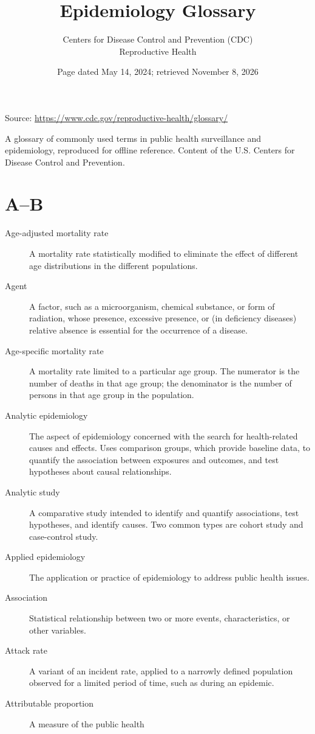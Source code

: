 \documentclass[11pt]{article}
\title{Epidemiology Glossary}
\author{Centers for Disease Control and Prevention (CDC)\\
Reproductive Health}
\date{Page dated May 14, 2024; retrieved November 8, 2026}
\begin{document}
\maketitle

\noindent Source: \url{https://www.cdc.gov/reproductive-health/glossary/}

\noindent A glossary of commonly used terms in public health
surveillance and epidemiology, reproduced for offline reference.
Content of the U.S. Centers for Disease Control and Prevention.

\section*{A--B}

\begin{description}
\item[Age-adjusted mortality rate] A mortality rate statistically
modified to eliminate the effect of different age distributions
in the different populations.
\item[Agent] A factor, such as a microorganism, chemical
substance, or form of radiation, whose presence, excessive
presence, or (in deficiency diseases) relative absence is
essential for the occurrence of a disease.
\item[Age-specific mortality rate] A mortality rate limited to a
particular age group. The numerator is the number of deaths in
that age group; the denominator is the number of persons in that
age group in the population.
\item[Analytic epidemiology] The aspect of epidemiology concerned
with the search for health-related causes and effects. Uses
comparison groups, which provide baseline data, to quantify the
association between exposures and outcomes, and test hypotheses
about causal relationships.
\item[Analytic study] A comparative study intended to identify
and quantify associations, test hypotheses, and identify causes.
Two common types are cohort study and case-control study.
\item[Applied epidemiology] The application or practice of
epidemiology to address public health issues.
\item[Association] Statistical relationship between two or more
events, characteristics, or other variables.
\item[Attack rate] A variant of an incident rate, applied to a
narrowly defined population observed for a limited period of
time, such as during an epidemic.
\item[Attributable proportion] A measure of the public health

\end{description}
\end{document}
